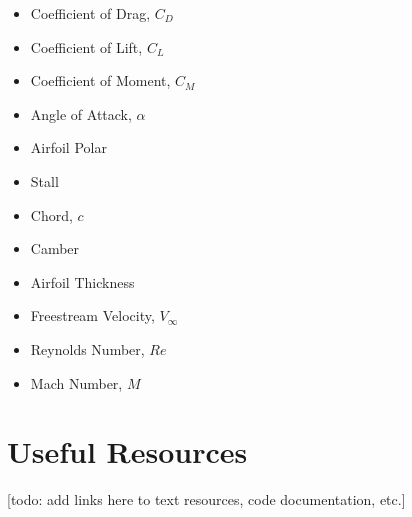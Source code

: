 \documentclass[12pt]{article}
\begin{document}
\begin{multicols}{2}
\begin{itemize}
    \item Coefficient of Drag, $C_D$
    \item Coefficient of Lift, $C_L$
    \item Coefficient of Moment, $C_M$
    \item Angle of Attack, $\alpha$
    \item Airfoil Polar
    \item Stall
    \item Chord, $c$
    \item Camber
    \item Airfoil Thickness
    \item Freestream Velocity, $V_\infty$
    \item Reynolds Number, $Re$
    \item Mach Number, $M$
\end{itemize}
\end{multicols}
	
	
	\section{Useful Resources}
	
	[todo: add links here to text resources, code documentation, etc.]
	
\end{document}
